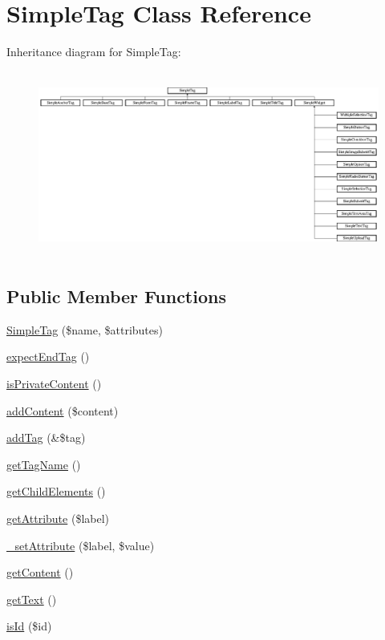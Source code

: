 \hypertarget{class_simple_tag}{
\section{SimpleTag Class Reference}
\label{class_simple_tag}
}
Inheritance diagram for SimpleTag:\begin{figure}[H]
\begin{center}
\leavevmode
\includegraphics[height=6.148649cm]{class_simple_tag}
\end{center}
\end{figure}
\subsection*{Public Member Functions}
\begin{DoxyCompactItemize}
\item 
\hyperlink{class_simple_tag_a5aca97a1a2ddca4c32bc2d256dc5a9ea}{SimpleTag} (\$name, \$attributes)
\item 
\hyperlink{class_simple_tag_a158fcbf8b82e7a6f7b6855c1dbe0715b}{expectEndTag} ()
\item 
\hyperlink{class_simple_tag_a6f1d7a187565b366e995d94da0f16ad4}{isPrivateContent} ()
\item 
\hyperlink{class_simple_tag_ae8478a7c35ab3c16e8284667cd5f0bd5}{addContent} (\$content)
\item 
\hyperlink{class_simple_tag_a5f5cc331c052dd6eb0bd104f68143c76}{addTag} (\&\$tag)
\item 
\hyperlink{class_simple_tag_af7b4ef02cdcfdc986f3e05fdf7256e6c}{getTagName} ()
\item 
\hyperlink{class_simple_tag_a23a987346d617cf9c50ee4937256e403}{getChildElements} ()
\item 
\hyperlink{class_simple_tag_adf9f23b7539f4d44984fd3f994205e59}{getAttribute} (\$label)
\item 
\hyperlink{class_simple_tag_a6bb44da8e2c6bca9f43d4130f427eecc}{\_\-setAttribute} (\$label, \$value)
\item 
\hyperlink{class_simple_tag_ab5e820ae55ae65b9accc7e72cbf1311b}{getContent} ()
\item 
\hyperlink{class_simple_tag_af1f897542b3aa323cd972b6719f550ee}{getText} ()
\item 
\hyperlink{class_simple_tag_aac3fe7e35538c3e517ed886e932f5cef}{isId} (\$id)
\end{DoxyCompactItemize}
